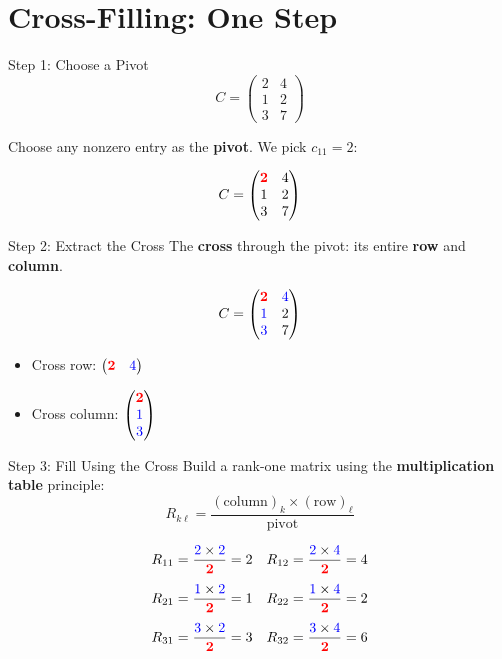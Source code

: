 \documentclass[10pt]{beamer}
\theoremstyle{definition}
\newcommand{\pvt}[1]{{\color{red}\mathbf{#1}}}       %
\newcommand{\crs}[1]{{\color{blue}#1}}                %
\newcommand{\x}[1]{\alert{\textbf{#1}}}
\begin{document}
\section{Cross-Filling: One Step}

\begin{frame}{Step 1: Choose a Pivot}
$$C = \begin{pmatrix}
2 & 4 \\
1 & 2 \\
3 & 7
\end{pmatrix}$$

\vfill
Choose any nonzero entry as the \x{pivot}. We pick $c_{11} = 2$:

$$C = \begin{pmatrix}
\pvt{2} & 4 \\
1 & 2 \\
3 & 7
\end{pmatrix}$$
\end{frame}

\begin{frame}{Step 2: Extract the Cross}
The \x{cross} through the pivot: its entire \x{row} and \x{column}.

$$C = \begin{pmatrix}
\pvt{2} & \crs{4} \\
\crs{1} & 2 \\
\crs{3} & 7
\end{pmatrix}$$

\vfill
\begin{itemize}
\item Cross row: $\begin{pmatrix} \pvt{2} & \crs{4} \end{pmatrix}$
\item Cross column: $\begin{pmatrix} \pvt{2} \\ \crs{1} \\ \crs{3} \end{pmatrix}$
\end{itemize}
\end{frame}

\begin{frame}{Step 3: Fill Using the Cross}
Build a rank-one matrix using the \x{multiplication table} principle:
$$R_{k\ell} = \frac{(\text{column})_k \times (\text{row})_\ell}{\text{pivot}}$$

\vfill
\begin{align*}
R_{11} &= \frac{\crs{2} \times \crs{2}}{\pvt{2}} = 2 &
R_{12} &= \frac{\crs{2} \times \crs{4}}{\pvt{2}} = 4 \\[4pt]
R_{21} &= \frac{\crs{1} \times \crs{2}}{\pvt{2}} = 1 &
R_{22} &= \frac{\crs{1} \times \crs{4}}{\pvt{2}} = 2 \\[4pt]
R_{31} &= \frac{\crs{3} \times \crs{2}}{\pvt{2}} = 3 &
R_{32} &= \frac{\crs{3} \times \crs{4}}{\pvt{2}} = 6
\end{align*}
\end{frame}
\end{document}
